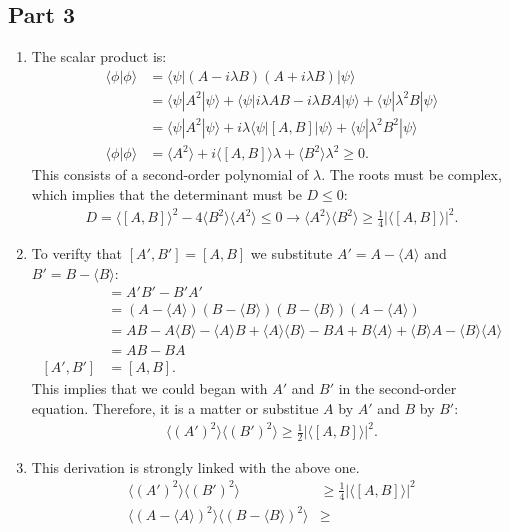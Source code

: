 \documentclass[letterpaper,11pt,twoside]{article}
\newcommand{\ket}[1]{|#1\rangle}
\newcommand{\bra}[1]{\langle#1|}
\newcommand{\braket}[1]{\langle#1\rangle}
\begin{document}
\subsection*{Part 3}
\begin{enumerate}[itemsep=0pt,topsep=0pt,label=(\alph*)]
  \item The scalar product is:
  \begin{align*}
    \braket{\phi|\phi}&=\bra{\psi}(A-i\lambda B)(A+i\lambda B)\ket{\psi}\\
    &=\braket{\psi|A^2|\psi}+\braket{\psi|i\lambda AB-i\lambda BA|\psi}+\braket{\psi|\lambda^2B|\psi}\\
    &=\braket{\psi|A^2|\psi}+i\lambda\braket{\psi|[A,B]|\psi}+\braket{\psi|\lambda^2B^2|\psi}\\
    \braket{\phi|\phi}&=\braket{A^2}+i\braket{[A,B]}\lambda+\braket{B^2}\lambda^2\geq0.
  \end{align*}
  This consists of a second-order polynomial of $\lambda$.
  The roots must be complex, which implies that the determinant must be $D\leq0$:
  \begin{align*}
    D=\braket{[A,B]}^2-4\braket{B^2}\braket{A^2}\leq0\longrightarrow\braket{A^2}\braket{B^2}\geq\frac{1}{4}|\braket{[A,B]}|^2.
  \end{align*}
  \item To verifty that $[A',B']=[A,B]$ we substitute $A'=A-\braket{A}$ and $B'=B-\braket{B}$:
  \begin{align*}
    [A',B']&=A'B'-B'A'\\
    &=(A-\braket{A})(B-\braket{B})(B-\braket{B})(A-\braket{A})\\
    &=AB-A\braket{B}-\braket{A}B+\braket{A}\braket{B}-BA+B\braket{A}+\braket{B}A-\braket{B}\braket{A}\\
    &=AB-BA\\
    [A',B']&=[A,B].
  \end{align*}
  This implies that we could began with $A'$ and $B'$ in the second-order equation. Therefore, it is a matter or substitue $A$ by $A'$ and $B$ by $B'$:
  \begin{align*}
    \braket{(A')^2}\braket{(B')^2}\geq\frac{1}{2}|\braket{[A,B]}|^2.
  \end{align*}
  \item This derivation is strongly linked with the above one. 
  \begin{align*}
    \braket{(A')^2}\braket{(B')^2}&\geq\frac{1}{4}|\braket{[A,B]}|^2\\
    \braket{(A-\braket{A})^2}\braket{(B-\braket{B})^2}&\geq\\

\end{align*}
\end{enumerate}
\end{document}
